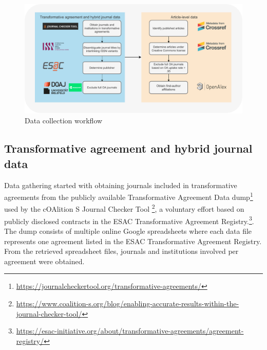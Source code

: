 \documentclass[a4paper,man,floatsintext,longtable,noextraspace,12pt]{apa6}
\begin{document}
\begin{figure}[ht!]

{\centering \includegraphics[width=0.99\linewidth,]{data_collection_workflow} 

}

\caption{Data collection workflow}\label{fig:data_workflow}
\end{figure}

\subsection{Transformative agreement and hybrid journal
data}\label{transformative-agreement-and-hybrid-journal-data}

Data gathering started with obtaining journals included in
transformative agreements from the publicly available Transformative
Agreement Data dump\footnote{\url{https://journalcheckertool.org/transformative-agreements/}}
used by the cOAlition S Journal Checker Tool \footnote{\url{https://www.coalition-s.org/blog/enabling-accurate-results-within-the-journal-checker-tool/}},
a voluntary effort based on publicly disclosed contracts in the ESAC
Transformative Agreement Registry.\footnote{\url{https://esac-initiative.org/about/transformative-agreements/agreement-registry/}}.
The dump consists of multiple online Google spreadsheets where each data
file represents one agreement listed in the ESAC Transformative
Agreement Registry. From the retrieved spreadsheet files, journals and
institutions involved per agreement were obtained.
\end{document}
